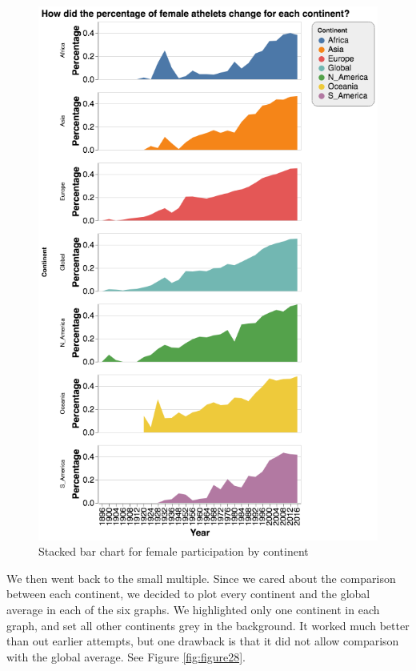\documentclass[
]{article}
\begin{document}
\begin{figure}

{\centering \includegraphics[width=0.8\linewidth]{static/pics/g-2-4_new} 

}

\caption{Stacked bar chart for female participation by continent}\label{fig:figure27}
\end{figure}

We then went back to the small multiple. Since we cared about the comparison between each continent, we decided to plot every continent and the global average in each of the six graphs. We highlighted only one continent in each graph, and set all other continents grey in the background. It worked much better than out earlier attempts, but one drawback is that it did not allow comparison with the global average. See Figure \ref{fig:figure28}.
\end{document}
